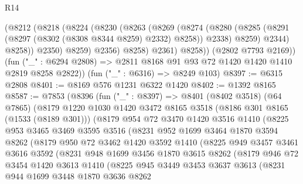 \begin{lexlean}{R14}
\begin{coremodule}
              (@8212
                (@8218
                  (@8224
                    (@8230
                      (@8263
                        (@8269
                          (@8274
                            (@8280
                              (@8285 (@8291 (@8297 (@8302 (@8308 @8344 @8259) @2332) @8258)) @2338)
                              @8259)
                            @2344)
                          @8258))
                      @2350)
                    @8259)
                  @2356)
                @8258)
              @2361)
            @8258))
        (@2802 @7793 @2169))
      (fun ("_" : @6294 @2808) => @2811 @8168 @91 @93 @72 @1420 @1420 @1410 @2819 @8258 @2822))
    (fun ("_" : @6316) => @8249 @103)
@8397 := @6315 @2808
@8401 := @8169 @576 @1231 @6322 @1420
@8402 := @1392 @8165
@8587 := @7853
    (@8396
      (fun ("_" : @8397) =>
      @8401
        (@8402 @3518)
        (@64 @7865)
        (@8179
          @1220
          @1030
          @1420
          @3472
          @8165
          @3518
          (@8186 @301 @8165 (@1533 (@8189 @301)))
          (@8179
            @954
            @72
            @3470
            @1420
            @3516
            @1410
            (@8225
              @953
              @3465
              @3469
              @3595
              @3516
              (@8231
                @952
                @1699
                @3464
                @1870
                @3594
                @8262
                (@8179
                  @950
                  @72
                  @3462
                  @1420
                  @3592
                  @1410
                  (@8225
                    @949
                    @3457
                    @3461
                    @3616
                    @3592
                    (@8231
                      @948
                      @1699
                      @3456
                      @1870
                      @3615
                      @8262
                      (@8179
                        @946
                        @72
                        @3454
                        @1420
                        @3613
                        @1410
                        (@8225
                          @945
                          @3449
                          @3453
                          @3637
                          @3613
                          (@8231
                            @944
                            @1699
                            @3448
                            @1870
                            @3636
                            @8262

\end{coremodule}
\end{lexlean}

